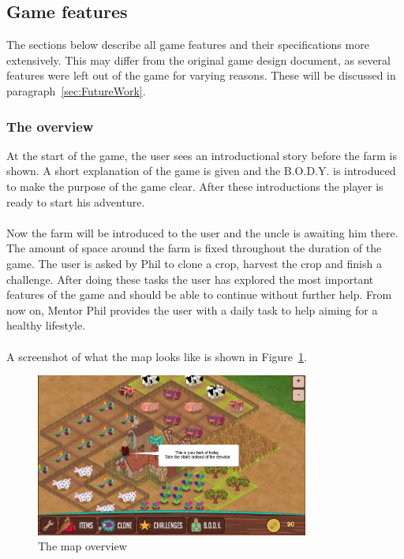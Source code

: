 \subsection{Game features}
\label{subsec:GameFeatures}
The sections below describe all game features and their specifications more extensively. This may differ from the original game design document, as several features were left out of the game for varying reasons. These will be discussed in paragraph~\ref{sec:FutureWork}.

\subsubsection{The overview}
At the start of the game, the user sees an introductional story before the farm is shown. A short explanation of the game is given and the B.O.D.Y. is introduced to make the purpose of the game clear. After these introductions the player is ready to start his adventure.
\\\\
Now the farm will be introduced to the user and the uncle is awaiting him there. The amount of space around the farm is fixed throughout the duration of the game. The user is asked by Phil to clone a crop, harvest the crop and finish a challenge. After doing these tasks the user has explored the most important features of the game and should be able to continue without further help. From now on, Mentor Phil provides the user with a daily task to help aiming for a healthy lifestyle. 
\\\\
A screenshot of what the map looks like is shown in Figure~\ref{fig:map}.

\begin{figure}[h]
	\centering
		\includegraphics[width=0.80\textwidth]{images/map.png}
	\caption{The map overview}
	\label{fig:map}
\end{figure}

